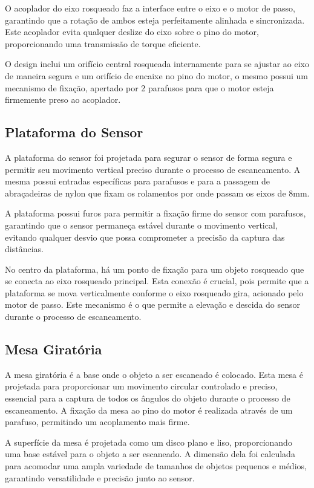 O acoplador do eixo rosqueado faz a interface entre o eixo e o motor de passo, garantindo que a rotação de ambos esteja perfeitamente alinhada e sincronizada. Este acoplador evita qualquer deslize do eixo sobre o pino do motor, proporcionando uma transmissão de torque eficiente.

O design inclui um orifício central rosqueada internamente para se ajustar ao eixo de maneira segura e um orifício de encaixe no pino do motor, o mesmo possui um mecanismo de fixação, apertado por 2 parafusos para que o motor esteja firmemente preso ao acoplador.

\subsection{Plataforma do Sensor}

A plataforma do sensor foi projetada para segurar o sensor de forma segura e permitir seu movimento vertical preciso durante o processo de escaneamento. A mesma possui entradas específicas para parafusos e para a passagem de abraçadeiras de nylon que fixam os rolamentos por onde passam os eixos de 8mm.

A plataforma possui furos para permitir a fixação firme do sensor com parafusos, garantindo que o sensor permaneça estável durante o movimento vertical, evitando qualquer desvio que possa comprometer a precisão da captura das distâncias.

No centro da plataforma, há um ponto de fixação para um objeto rosqueado que se conecta ao eixo rosqueado principal. Esta conexão é crucial, pois permite que a plataforma se mova verticalmente conforme o eixo rosqueado gira, acionado pelo motor de passo. Este mecanismo é o que permite a elevação e descida do sensor durante o processo de escaneamento.

\subsection{Mesa Giratória}

A mesa giratória é a base onde o objeto a ser escaneado é colocado. Esta mesa é projetada para proporcionar um movimento circular controlado e preciso, essencial para a captura de todos os ângulos do objeto durante o processo de escaneamento. A fixação da mesa ao pino do motor é realizada através de um parafuso, permitindo um acoplamento mais firme.

A superfície da mesa é projetada como um disco plano e liso, proporcionando uma base estável para o objeto a ser escaneado. A dimensão dela foi calculada para acomodar uma ampla variedade de tamanhos de objetos pequenos e médios, garantindo versatilidade e precisão junto ao sensor.

